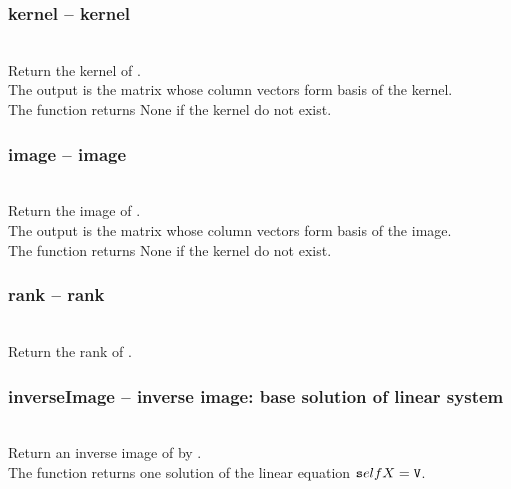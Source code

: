   \subsubsection{kernel -- kernel}
   \\
   \spacing
   \quad Return the kernel of .\\
   \spacing
   \quad The output is the matrix whose column vectors form basis of the kernel.\\
   The function returns None if the kernel do not exist.\\
  \subsubsection{image -- image}
   \\
   \spacing
   \quad Return the image of .\\
   \spacing
   \quad The output is the matrix whose column vectors form basis of the image.\\
   The function returns None if the kernel do not exist.\\
  \subsubsection{rank -- rank}
   \\
   \spacing
   \quad Return the rank of .\\
   \spacing
  \subsubsection{inverseImage -- inverse image: base solution of linear system}
   \\
   \spacing
   \quad Return an inverse image of  by .\\
   \spacing
   \quad The function returns one solution of the linear equation ${\texttt self}X={\texttt V}$.
   \spacing
